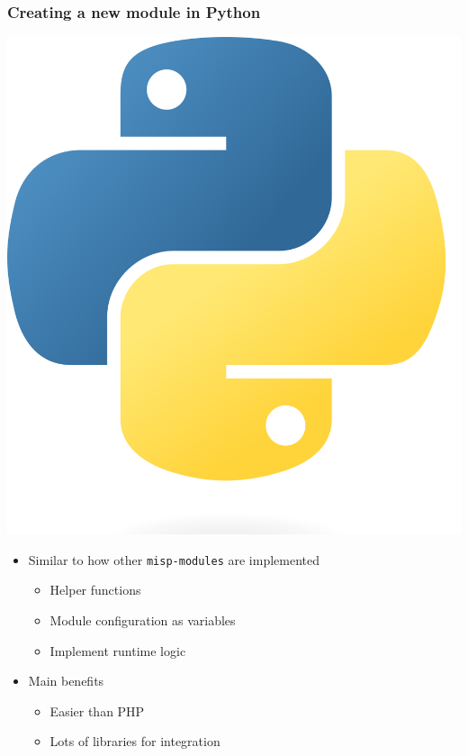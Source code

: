 \begin{frame}
    \frametitle{Creating a new module in Python}
    \begin{center}
        \includegraphics[scale=0.05]{pictures/python-logo.png}
    \end{center}
    \begin{itemize}
        \item Similar to how other \texttt{misp-modules} are implemented
        \begin{itemize}
            \item Helper functions
            \item Module configuration as variables
            \item Implement runtime logic
        \end{itemize}
        \item Main benefits
        \begin{itemize}
            \item Easier than PHP
            \item Lots of libraries for integration
        \end{itemize}
    \end{itemize}
\end{frame}

